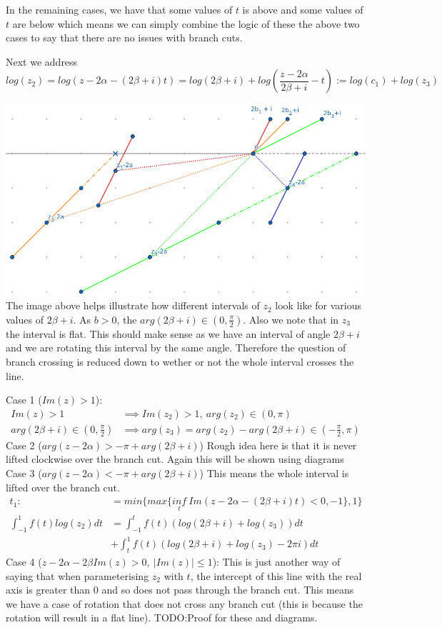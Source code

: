 \documentclass{article}
\begin{document}
In the remaining cases, we have that some values of $t$ is above and some values of $t$ are below which means we can simply combine the logic of these the above two cases to say that there are no issues with branch cuts.

Next we address
$$log(z_2)=log(z-2\alpha-(2\beta+i)t)=log(2\beta+i)+log(\frac{z-2\alpha}{2\beta+i}-t):=log(c_1)+log(z_3)$$

\includegraphics[width=\textwidth]{z23}
The image above helps illustrate how different intervals of $z_2$ look like for various values of $2\beta+i$.
As $b>0$, the $arg(2\beta+i)\in(0,\frac{\pi}{2})$.
Also we note that in $z_3$ the interval is flat.
This should make sense as we have an interval of angle $2\beta+i$ and we are rotating this interval by the same angle.
Therefore the question of branch crossing is reduced down to wether or not the whole interval crosses the line.

Case 1 ($Im(z)>1$):
\begin{align}
    Im(z)>1 &\implies Im(z_2)>1,\:arg(z_2)\in(0,\pi)\\
    arg(2\beta+i)\in(0,\frac{\pi}{2}) &\implies arg(z_3) = arg(z_2)-arg(2\beta + i) \in (-\frac{\pi}{2},\pi)
\end{align}
Case 2 ($arg(z-2\alpha)>-\pi+arg(2\beta+i)$)
Rough idea here is that it is never lifted clockwise over the branch cut.
Again this will be shown using diagrams
Case 3 ($arg(z-2\alpha)<-\pi+arg(2\beta+i)$)
This means the whole interval is lifted over the branch cut.
\begin{align}
    t_1 :&= min\{max\{\underset{t}{inf}\:Im(z-2\alpha-(2\beta+i)t)<0,-1\},1\}\\
    \int_{-1}^1f(t)log(z_2)dt &= \int_{-1}^tf(t)(log(2\beta+i)+log(z_3))dt\\
    &+\int_t^1f(t)(log(2\beta+i)+log(z_3)-2\pi i)dt
\end{align}
Case 4 ($z-2\alpha-2\beta Im(z)>0,\: |Im(z)|\leq 1$):
This is just another way of saying that when parameterising $z_2$ with $t$, the intercept of this line with the real axis is greater than $0$ and so does not pass through the branch cut.
This means we have a case of rotation that does not cross any branch cut (this is because the rotation will result in a flat line).
TODO:Proof for these and diagrams.
\end{document}
